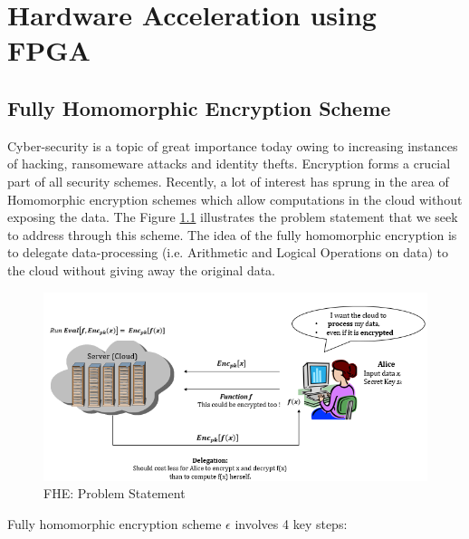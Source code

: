 \chapter{Hardware Acceleration using FPGA}
\label{ch5_fhew}

\section{Fully Homomorphic Encryption Scheme}
\label{5_1}
Cyber-security is a topic of great importance today owing to increasing instances of hacking, ransomeware attacks and identity thefts. Encryption forms a crucial part of all security schemes. Recently, a lot of interest has sprung in the area of Homomorphic encryption schemes which allow computations in the cloud without exposing the data. The Figure \ref{fig:fhew_prob_stmt} illustrates the problem statement that we seek to address through this scheme. The idea of the fully homomorphic encryption is to delegate data-processing (i.e. Arithmetic and Logical Operations on data) to the cloud without giving away the original data. 
\begin{figure}[h!]
 \centering
 \includegraphics[width=\linewidth]{figures/fhew_prob_stmt.PNG}
 \caption{FHE: Problem Statement
 \cite{shai_he}}
 \label{fig:fhew_prob_stmt}
\end{figure}
Fully homomorphic encryption scheme $\epsilon$ involves 4 key steps:
